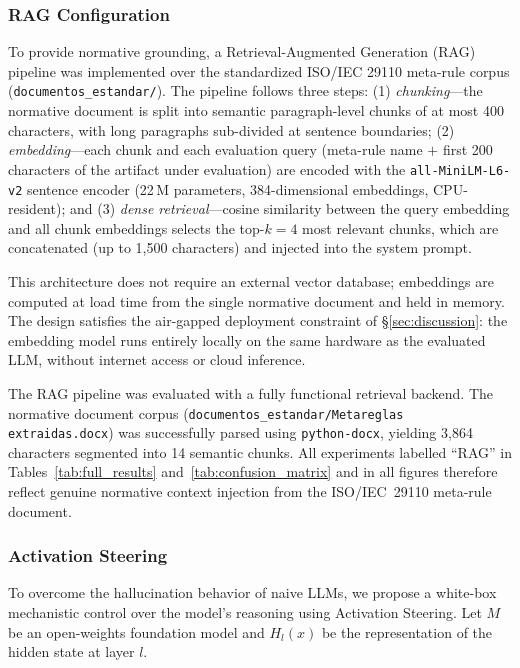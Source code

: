 \documentclass{ieeeaccess}
\begin{document}
\subsubsection{RAG Configuration}

To provide normative grounding, a Retrieval-Augmented Generation (RAG) pipeline was implemented over the standardized ISO/IEC 29110 meta-rule corpus (\texttt{documentos\_estandar/}). The pipeline follows three steps: (1) \emph{chunking}---the normative document is split into semantic paragraph-level chunks of at most 400 characters, with long paragraphs sub-divided at sentence boundaries; (2) \emph{embedding}---each chunk and each evaluation query (meta-rule name $+$ first 200 characters of the artifact under evaluation) are encoded with the \texttt{all-MiniLM-L6-v2} sentence encoder (22\,M parameters, 384-dimensional embeddings, CPU-resident); and (3) \emph{dense retrieval}---cosine similarity between the query embedding and all chunk embeddings selects the top-$k=4$ most relevant chunks, which are concatenated (up to 1,500 characters) and injected into the system prompt.

This architecture does not require an external vector database; embeddings are computed at load time from the single normative document and held in memory. The design satisfies the air-gapped deployment constraint of §\ref{sec:discussion}: the embedding model runs entirely locally on the same hardware as the evaluated LLM, without internet access or cloud inference.

The RAG pipeline was evaluated with a fully functional retrieval backend. The normative document corpus (\texttt{documentos\_estandar/Metareglas extraidas.docx}) was successfully parsed using \texttt{python-docx}, yielding 3,864 characters segmented into 14 semantic chunks. All experiments labelled ``RAG'' in Tables~\ref{tab:full_results} and~\ref{tab:confusion_matrix} and in all figures therefore reflect genuine normative context injection from the ISO/IEC~29110 meta-rule document.

\subsubsection{Activation Steering}

To overcome the hallucination behavior of naive LLMs, we propose a white-box mechanistic control over the model's reasoning using Activation Steering. Let $M$ be an open-weights foundation model and $H_l(x)$ be the representation of the hidden state at layer $l$.
\end{document}
